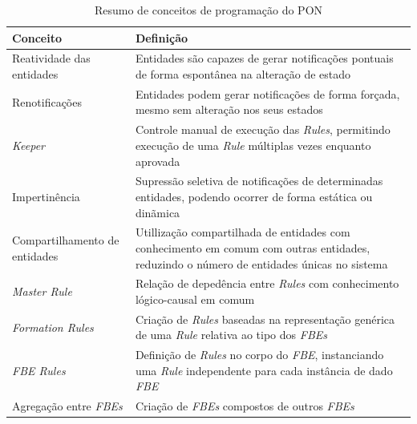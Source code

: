 \begin{table}[!htb]
\centering
\caption{Resumo de conceitos de programação do PON}
\begin{tabularx}{\textwidth}{l|X}
Conceito                              & Definição                                                                                                                                  \\ \hline\hline
Reatividade das entidades             & Entidades são capazes de gerar notificações pontuais de forma espontânea na alteração de estado                                            \\ \hline
Renotificações                        & Entidades podem gerar notificações de forma forçada, mesmo sem alteração nos seus estados                                                  \\ \hline
\textit{Keeper}                       & Controle manual de execução das \textit{Rules}, permitindo execução de uma \textit{Rule} múltiplas vezes enquanto aprovada                 \\ \hline
Impertinência                         & Supressão seletiva de notificações de determinadas entidades, podendo ocorrer de forma estática ou dinãmica                                \\ \hline
Compartilhamento de entidades         & Utillização compartilhada de entidades com conhecimento em comum com outras entidades, reduzindo o número de entidades únicas no sistema   \\ \hline
\textit{Master Rule}                  & Relação de depedência entre \textit{Rules} com conhecimento lógico-causal em comum                                                         \\ \hline
\textit{Formation Rules}              & Criação de \textit{Rules} baseadas na representação genérica de uma \textit{Rule} relativa ao tipo dos \textit{FBEs}                       \\ \hline
\textit{FBE Rules}                    & Definição de \textit{Rules} no corpo do \textit{FBE}, instanciando uma \textit{Rule} independente para cada instância de dado \textit{FBE} \\ \hline
Agregação entre \textit{FBEs}         & Criação de \textit{FBEs} compostos de outros \textit{FBEs}                                                                                 \\ \hline
\end{tabularx}
\label{tab:resumo_conceitos}
\end{table}

